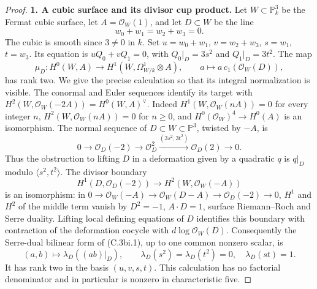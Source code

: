 \begin{proof}
\textbf{1. A cubic surface and its divisor cup product.}
Let $W\subset\mathbb P^3_k$ be the Fermat cubic surface, let
$A=\mathcal O_W(1)$, and let $D\subset W$ be the line
\[
 w_0+w_1=w_2+w_3=0.
\]
The cubic is smooth since $3\ne0$ in $k$. Set
$u=w_0+w_1$, $v=w_2+w_3$, $s=w_1$, $t=w_3$. Its equation is
$uQ_0+vQ_1=0$, with $Q_0|_D=3s^2$ and $Q_1|_D=3t^2$.
The map
\[
 \mu_D:H^0(W,A)\longrightarrow H^1(W,\Omega^1_{W/k}\otimes A),
 \qquad a\longmapsto a\,c_1(\mathcal O_W(D)),
 \tag{C.3bi.1}
\]
has rank two. We give the precise calculation so that its integral
normalization is visible. The conormal and Euler sequences identify its
target with $H^2(W,\mathcal O_W(-2A))=H^0(W,A)^\vee$.
Indeed $H^1(W,\mathcal O_W(nA))=0$ for every integer $n$,
$H^2(W,\mathcal O_W(nA))=0$ for $n\ge0$, and
$H^0(\mathcal O_W)^4\to H^0(A)$ is an isomorphism. The normal
sequence of $D\subset W\subset\mathbb P^3$, twisted by $-A$, is
\[
 0\longrightarrow\mathcal O_D(-2)\longrightarrow\mathcal O_D^2
 \xrightarrow{(3s^2,3t^2)}\mathcal O_D(2)\longrightarrow0.
\]
Thus the obstruction to lifting $D$ in a deformation given by a quadratic
$q$ is $q|_D$ modulo $\langle s^2,t^2\rangle$.
The divisor boundary
\[
 H^1(D,\mathcal O_D(-2))\longrightarrow H^2(W,\mathcal O_W(-A))
\]
is an isomorphism: in
$0\to\mathcal O_W(-A)\to\mathcal O_W(D-A)\to\mathcal O_D(-2)\to0$,
$H^1$ and $H^2$ of the middle term vanish by
$D^2=-1$, $A\cdot D=1$, surface Riemann--Roch and Serre duality.
Lifting local defining equations of $D$ identifies this boundary with
contraction of the deformation cocycle with $d\log\mathcal O_W(D)$.
Consequently the Serre-dual bilinear form of (C.3bi.1), up to one common
nonzero scalar, is
\[
 (a,b)\longmapsto\lambda_D((ab)|_D),\qquad
 \lambda_D(s^2)=\lambda_D(t^2)=0,\quad\lambda_D(st)=1.
 \tag{C.3bi.2}
\]
It has rank two in the basis $(u,v,s,t)$. This calculation has no
factorial denominator and in particular is nonzero in characteristic five.


\end{proof}
